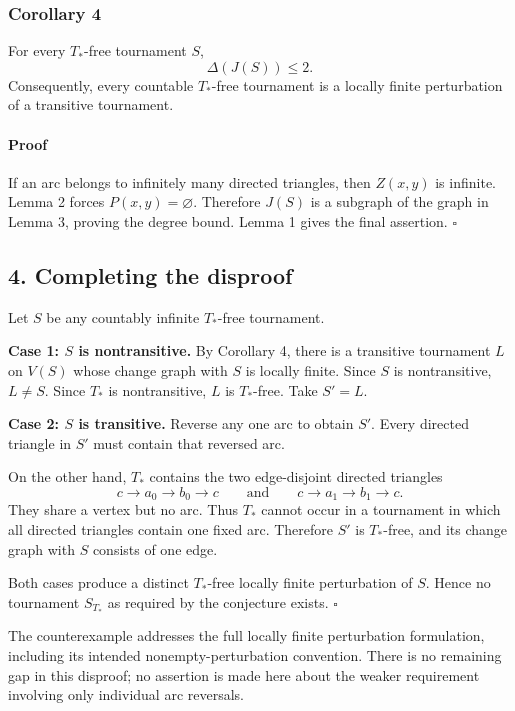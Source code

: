 \documentclass[
  11pt,
  a4paper,
]{article}
\newcounter{none} %
\begin{document}
\subsubsection{Corollary 4}\label{corollary-4}

For every \(T_\ast\)-free tournament \(S\), \[
\Delta(J(S))\le 2.
\] Consequently, every countable \(T_\ast\)-free tournament is a locally
finite perturbation of a transitive tournament.

\paragraph{Proof}\label{proof-3}

If an arc belongs to infinitely many directed triangles, then \(Z(x,y)\)
is infinite. Lemma 2 forces \(P(x,y)=\varnothing\). Therefore \(J(S)\)
is a subgraph of the graph in Lemma 3, proving the degree bound. Lemma 1
gives the final assertion. \(\square\)

\subsection{4. Completing the disproof}\label{completing-the-disproof}

Let \(S\) be any countably infinite \(T_\ast\)-free tournament.

\textbf{Case 1: \(S\) is nontransitive.} By Corollary 4, there is a
transitive tournament \(L\) on \(V(S)\) whose change graph with \(S\) is
locally finite. Since \(S\) is nontransitive, \(L\ne S\). Since
\(T_\ast\) is nontransitive, \(L\) is \(T_\ast\)-free. Take \(S'=L\).

\textbf{Case 2: \(S\) is transitive.} Reverse any one arc to obtain
\(S'\). Every directed triangle in \(S'\) must contain that reversed
arc.

On the other hand, \(T_\ast\) contains the two edge-disjoint directed
triangles \[
c\to a_0\to b_0\to c
\qquad\text{and}\qquad
c\to a_1\to b_1\to c.
\] They share a vertex but no arc. Thus \(T_\ast\) cannot occur in a
tournament in which all directed triangles contain one fixed arc.
Therefore \(S'\) is \(T_\ast\)-free, and its change graph with \(S\)
consists of one edge.

Both cases produce a distinct \(T_\ast\)-free locally finite
perturbation of \(S\). Hence no tournament \(S_{T_\ast}\) as required by
the conjecture exists. \(\square\)

The counterexample addresses the full locally finite perturbation
formulation, including its intended nonempty-perturbation convention.
There is no remaining gap in this disproof; no assertion is made here
about the weaker requirement involving only individual arc reversals.
\end{document}
